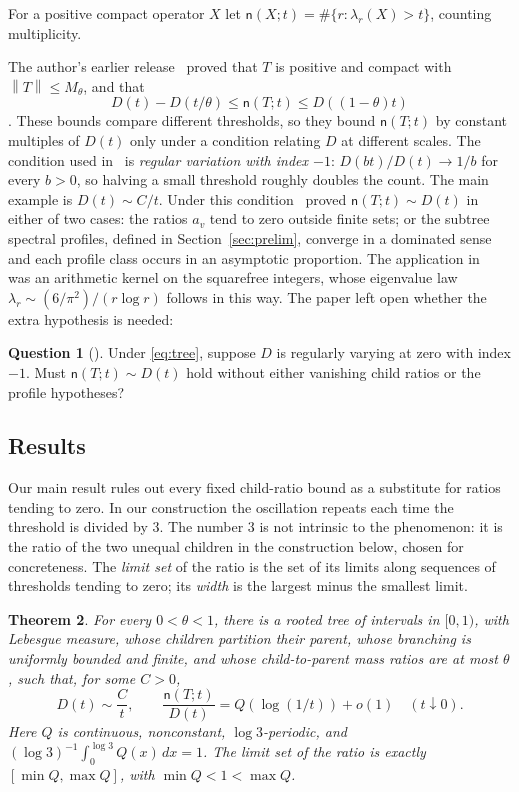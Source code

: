 \documentclass[11pt]{article}
\newtheorem{theorem}{Theorem}[section]
\theoremstyle{definition}
\newtheorem{question}[theorem]{Question}
\theoremstyle{remark}
\newcommand{\ncount}{\mathsf n}
\newcommand{\norm}[1]{\left\lVert #1\right\rVert}
\begin{document}
For a positive compact operator $X$ let $\ncount(X;t)=\#\{r:\lambda_r(X)>t\}$,
counting multiplicity.

The author's earlier release~\cite{K26} proved that $T$ is positive and
compact with $\norm T\le M_\theta$, and that
\[
 D(t)-D(t/\theta)\le\ncount(T;t)\le D((1-\theta)t)
\]
\cite[Prop.~3.2]{K26}. These bounds compare different thresholds, so
they bound $\ncount(T;t)$ by constant multiples of $D(t)$ only under a
condition relating $D$ at different scales. The condition used
in~\cite{K26} is \emph{regular variation with index $-1$}:
$D(bt)/D(t)\to1/b$ for every $b>0$, so halving a small threshold roughly
doubles the count. The main example is $D(t)\sim C/t$. Under this
condition~\cite[Thms.~3.4 and~A.4]{K26} proved $\ncount(T;t)\sim D(t)$
in either of two cases: the ratios $a_v$ tend to zero outside finite
sets; or the subtree spectral profiles, defined in
Section~\ref{sec:prelim}, converge in a dominated sense and each profile
class occurs in an asymptotic proportion. The application in~\cite{K26}
was an arithmetic kernel on the squarefree integers, whose eigenvalue law
$\lambda_r\sim(6/\pi^2)/(r\log r)$ follows in this way. The paper left
open whether the extra hypothesis is needed:

\begin{question}[{\cite[Question~7.1]{K26}}]\label{q:drop}
Under \eqref{eq:tree}, suppose $D$ is regularly varying at zero with index
$-1$. Must $\ncount(T;t)\sim D(t)$ hold without either vanishing child
ratios or the profile hypotheses?
\end{question}

\subsection{Results}
Our main result rules out every fixed child-ratio bound as a substitute
for ratios tending to zero. In our construction the oscillation repeats
each time the threshold is divided by $3$. The number $3$ is not
intrinsic to the phenomenon: it is the ratio of the two unequal children
in the construction below, chosen for concreteness. The \emph{limit set} of the ratio is the set
of its limits along sequences of thresholds tending to zero; its
\emph{width} is the largest minus the smallest limit.

\begin{theorem}\label{thm:main}
For every $0<\theta<1$, there is a rooted tree of intervals in $[0,1)$,
with Lebesgue measure, whose children partition their parent, whose
branching is uniformly bounded and finite, and whose child-to-parent
mass ratios are at most $\theta$, such that, for some $C>0$,
\[
 D(t)\sim\frac Ct,\qquad
 \frac{\ncount(T;t)}{D(t)}=Q(\log(1/t))+o(1)\quad(t\downarrow0).
\]
Here $Q$ is continuous, nonconstant, $\log3$-periodic, and
$(\log3)^{-1}\int_0^{\log3}Q(x)\,dx=1$. The limit set of the ratio is
exactly $[\min Q,\max Q]$, with $\min Q<1<\max Q$.
\end{theorem}
\end{document}
